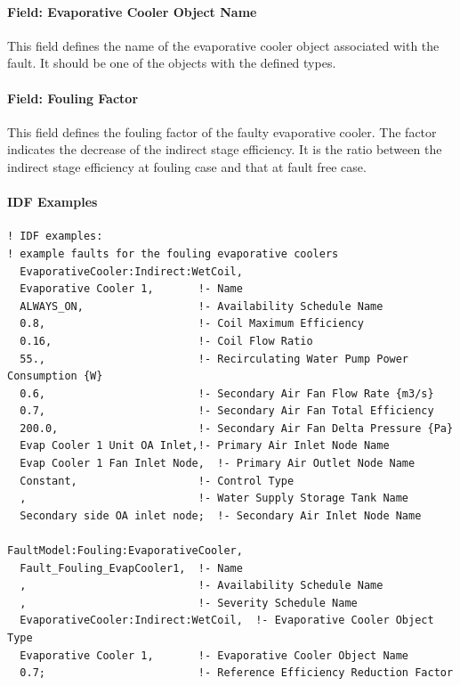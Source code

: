 \paragraph{Field: Evaporative Cooler Object Name}\label{field-evaporative-cooler-object-name}

This field defines the name of the evaporative cooler object associated with the fault. It should be one of the objects with the defined types.

\paragraph{Field: Fouling Factor}\label{field-fouling-factor}

This field defines the fouling factor of the faulty evaporative cooler. The factor indicates the decrease of the indirect stage efficiency. It is the ratio between the indirect stage efficiency at fouling case and that at fault free case.

\paragraph{IDF Examples}

\begin{lstlisting}
! IDF examples:
! example faults for the fouling evaporative coolers
  EvaporativeCooler:Indirect:WetCoil,
  Evaporative Cooler 1,       !- Name
  ALWAYS_ON,                  !- Availability Schedule Name
  0.8,                        !- Coil Maximum Efficiency
  0.16,                       !- Coil Flow Ratio
  55.,                        !- Recirculating Water Pump Power Consumption {W}
  0.6,                        !- Secondary Air Fan Flow Rate {m3/s}
  0.7,                        !- Secondary Air Fan Total Efficiency
  200.0,                      !- Secondary Air Fan Delta Pressure {Pa}
  Evap Cooler 1 Unit OA Inlet,!- Primary Air Inlet Node Name
  Evap Cooler 1 Fan Inlet Node,  !- Primary Air Outlet Node Name
  Constant,                   !- Control Type
  ,                           !- Water Supply Storage Tank Name
  Secondary side OA inlet node;  !- Secondary Air Inlet Node Name

FaultModel:Fouling:EvaporativeCooler,
  Fault_Fouling_EvapCooler1,  !- Name
  ,                           !- Availability Schedule Name
  ,                           !- Severity Schedule Name
  EvaporativeCooler:Indirect:WetCoil,  !- Evaporative Cooler Object Type
  Evaporative Cooler 1,       !- Evaporative Cooler Object Name
  0.7;                        !- Reference Efficiency Reduction Factor
\end{lstlisting}


